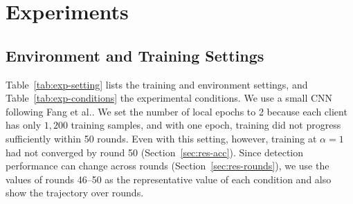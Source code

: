 \documentclass[a4paper,10pt]{article}
\begin{document}
\section{Experiments}
\label{sec:experiment}

\subsection{Environment and Training Settings}
\label{sec:exp-setting}

Table~\ref{tab:exp-setting} lists the training and environment settings, and Table~\ref{tab:exp-conditions} the experimental conditions. We use a small CNN following Fang et al.\cite{fang2020local}. We set the number of local epochs to 2 because each client has only $1{,}200$ training samples, and with one epoch, training did not progress sufficiently within 50 rounds. Even with this setting, however, training at $\alpha=1$ had not converged by round 50 (Section~\ref{sec:res-acc}). Since detection performance can change across rounds (Section~\ref{sec:res-rounds}), we use the values of rounds 46--50 as the representative value of each condition and also show the trajectory over rounds.
\end{document}
